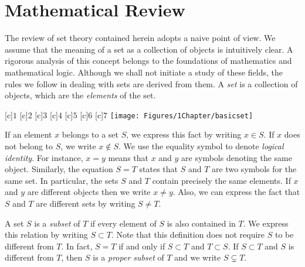 \chapter{Mathematical Review}

The review of set theory contained herein adopts a naive point of view.
We assume that the meaning of a set as a collection of objects is intuitively clear.
A rigorous analysis of this concept belongs to the foundations of mathematics and mathematical logic.
Although we shall not initiate a study of these fields, the rules we follow in dealing with sets are derived from them.
A \emph{set} is a collection of objects, which are the \emph{elements} of the set.  

\begin{center}
\begin{psfrags}
[c]{$1$}
[c]{$2$}
[c]{$3$}
[c]{$4$}
[c]{$5$}
[c]{$6$}
[c]{$7$}
\texttt{[image: Figures/1Chapter/basicset]}
\end{psfrags}
\end{center}

If an element $x$ belongs to a set $S$, we express this fact by writing $x \in S$.
If $x$ does not belong to $S$, we write $x \notin S$.
We use the equality symbol to denote \emph{logical identity}.
For instance, $x = y$ means that $x$ and $y$ are symbols denoting the same object.
Similarly, the equation $S = T$ states that $S$ and $T$ are two symbols for the same set.
In particular, the sets $S$ and $T$ contain precisely the same elements.
If $x$ and $y$ are different objects then we write $x \neq y$.
Also, we can express the fact that $S$ and $T$ are different sets by writing $S \neq T$.

A set $S$ is a \emph{subset} of $T$ if every element of $S$ is also contained in $T$. 
We express this relation by writing $S \subset T$.
Note that this definition does not require $S$ to be different from $T$.
In fact, $S = T$ if and only if $S \subset T$ and $T \subset S$.
If $S \subset T$ and $S$ is different from $T$, then $S$ is a \emph{proper subset} of $T$ and we write $S \subsetneq T$. 

